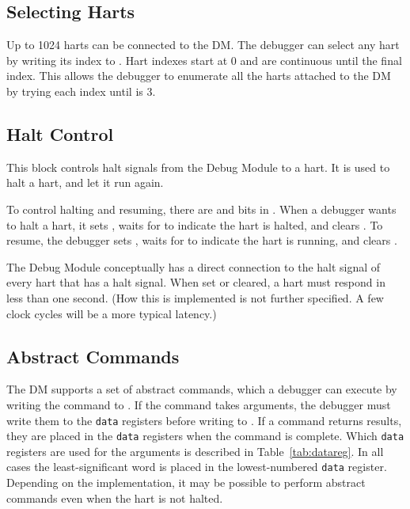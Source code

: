 \documentclass{article}
\begin{document}
\subsection{Selecting Harts} \label{selectingharts}

Up to 1024 harts can be connected to the DM. The debugger can select any hart
by writing its index to \Fhartsel. Hart indexes start at 0 and are continuous
until the final index. This allows the debugger to enumerate all the harts
attached to the DM by trying each index until \Fhartstatus is 3.

\subsection{Halt Control} \label{haltcontrol}

This block controls halt signals from the Debug Module to a hart.  It is used
to halt a hart, and let it run again.

To control halting and resuming, there are \Fhaltreq and \Fresumereq bits in
\Rdmcontrol.  When a debugger wants to halt a hart, it sets \Fhaltreq, waits
for \Fhartstatus to indicate the hart is halted, and clears \Fhaltreq.  To
resume, the debugger sets \Fresumereq, waits for \Fhartstatus to indicate the
hart is running, and clears \Fresumereq.

The Debug Module conceptually has a direct connection to the halt signal of
every hart that has a halt signal. When set or cleared, a hart must respond in
less than one second.  (How this is implemented is not further specified. A few
clock cycles will be a more typical latency.)

\subsection{Abstract Commands} \label{abstractcommands}

The DM supports a set of abstract commands, which a debugger can execute by
writing the command to \Rcommand.  If the command takes arguments, the debugger
must write them to the {\tt data} registers before writing to \Rcommand. If a
command returns results, they are placed in the {\tt data} registers when the
command is complete. Which {\tt data} registers are used for the arguments is
described in Table~\ref{tab:datareg}.  In all cases the least-significant word
is placed in the lowest-numbered {\tt data} register.  Depending on the
implementation, it may be possible to perform abstract commands even when the
hart is not halted.
\end{document}
